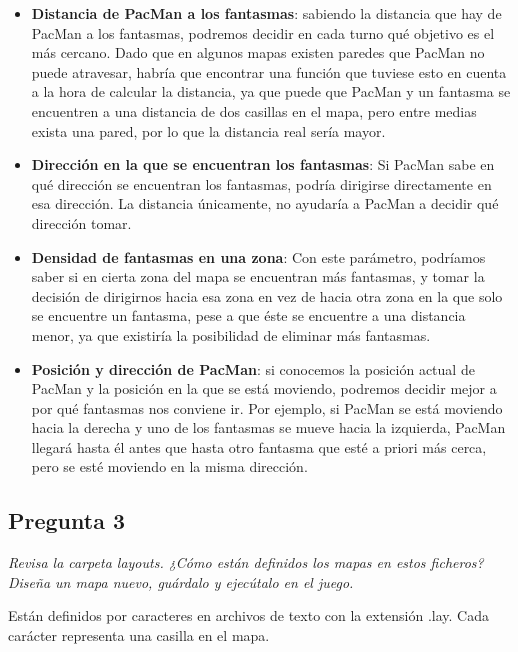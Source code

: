 \documentclass[12pt]{article}
\begin{document}
\begin{itemize}
    \item \textbf{Distancia de PacMan a los fantasmas}: sabiendo la distancia
    que hay de PacMan a los fantasmas, podremos decidir en cada turno qué
    objetivo es el más cercano. Dado que en algunos mapas existen paredes que
    PacMan no puede atravesar, habría que encontrar una función que tuviese
    esto en cuenta a la hora de calcular la distancia, ya que puede que PacMan
    y un fantasma se encuentren a una distancia de dos casillas en el mapa,
    pero entre medias exista una pared, por lo que la distancia real sería mayor.
    \item \textbf{Dirección en la que se encuentran los fantasmas}: Si PacMan
    sabe en qué dirección se encuentran los fantasmas, podría dirigirse
    directamente en esa dirección. La distancia únicamente, no ayudaría a
    PacMan a decidir qué dirección tomar.
    \item \textbf{Densidad de fantasmas en una zona}: Con este parámetro,
    podríamos saber si en cierta zona del mapa se encuentran más fantasmas, y
    tomar la decisión de dirigirnos hacia esa zona en vez de hacia otra zona en
    la que solo se encuentre un fantasma, pese a que éste se encuentre a una
    distancia menor, ya que existiría la posibilidad de eliminar más fantasmas.
    \item \textbf{Posición y dirección de PacMan}: si conocemos la posición
    actual de PacMan y la posición en la que se está moviendo, podremos decidir
    mejor a por qué fantasmas nos conviene ir. Por ejemplo, si PacMan se está
    moviendo hacia la derecha y uno de los fantasmas se mueve hacia la
    izquierda, PacMan llegará hasta él antes que hasta otro fantasma que esté a
    priori más cerca, pero se esté moviendo en la misma dirección.
\end{itemize}


\newpage
\begin{center}
\subsection{Pregunta 3}

\emph{Revisa la carpeta layouts. ¿Cómo están definidos los mapas en estos
ficheros? Diseña un mapa nuevo, guárdalo y ejecútalo en el juego.}
\end{center}

Están definidos por caracteres en archivos de texto con la extensión .lay.
 Cada carácter representa una casilla en el mapa.
\end{document}
